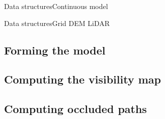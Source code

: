 \begin{frame}{Data structures}{Continuous model}

\end{frame}

\begin{frame}{Data structures}{Grid DEM}
	LiDAR
\end{frame}

\subsection{Forming the model}


\subsection{Computing the visibility map}


\subsection{Computing occluded paths}

